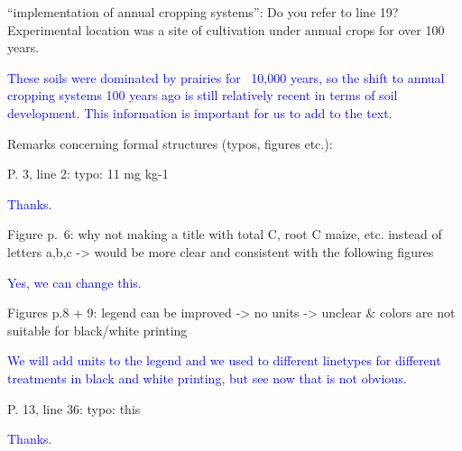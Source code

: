\documentclass[]{article}
\begin{document}
``implementation of annual cropping systems'': Do you refer to line 19?
Experimental location was a site of cultivation under annual crops for
over 100 years.

\textcolor{blue}{These soils were dominated by prairies for ~10,000 years, so the shift to annual cropping systems 100 years ago is still relatively recent in terms of soil development. This information is important for us to add to the text.}

Remarks concerning formal structures (typos, figures etc.):

P. 3, line 2: typo: 11 mg kg-1

\textcolor{blue}{Thanks.}

Figure p.~6: why not making a title with total C, root C maize, etc.
instead of letters a,b,c -\textgreater{} would be more clear and
consistent with the following figures

\textcolor{blue}{Yes, we can change this.}

Figures p.8 + 9: legend can be improved -\textgreater{} no units
-\textgreater{} unclear \& colors are not suitable for black/white
printing

\textcolor{blue}{We will add units to the legend and we used to different linetypes for different treatments in black and white printing, but see now that is not obvious.}

P. 13, line 36: typo: this

\textcolor{blue}{Thanks.}
\end{document}

